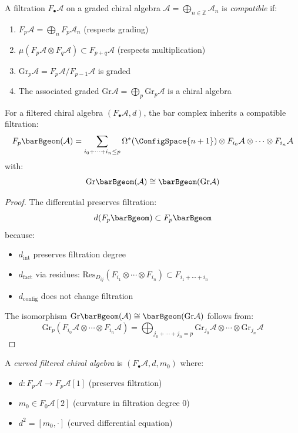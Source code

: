 \begin{definition}
A filtration $F_\bullet\mathcal{A}$ on a graded chiral algebra $\mathcal{A} = \bigoplus_{n \in \mathbb{Z}} \mathcal{A}_n$ is \emph{compatible} if:
\begin{enumerate}
\item $F_p\mathcal{A} = \bigoplus_{n} F_p\mathcal{A}_n$ (respects grading)
\item $\mu(F_p\mathcal{A} \otimes F_q\mathcal{A}) \subset F_{p+q}\mathcal{A}$ (respects multiplication)
\item $\text{Gr}_p\mathcal{A} = F_p\mathcal{A}/F_{p-1}\mathcal{A}$ is graded
\item The associated graded $\text{Gr}\mathcal{A} = \bigoplus_p \text{Gr}_p\mathcal{A}$ is a chiral algebra
\end{enumerate}
\end{definition}

\begin{theorem}
\label{thm:filtered-bar-complex}
For a filtered chiral algebra $(F_\bullet\mathcal{A}, d)$, the bar complex inherits a compatible filtration:
\[F_p\barBgeom(\mathcal{A}) = \sum_{i_0 + \cdots + i_n \leq p} \Omega^*(\ConfigSpace{n+1}) \otimes F_{i_0}\mathcal{A} \otimes \cdots \otimes F_{i_n}\mathcal{A}\]
with:
\[\text{Gr}\barBgeom(\mathcal{A}) \cong \barBgeom(\text{Gr}\mathcal{A})\]
\end{theorem}

\begin{proof}
The differential preserves filtration:
\[d(F_p\barBgeom) \subset F_p\barBgeom\]
because:
\begin{itemize}
\item $d_{\text{int}}$ preserves filtration degree
\item $d_{\text{fact}}$ via residues: $\text{Res}_{D_{ij}}(F_{i_1} \otimes \cdots \otimes F_{i_n}) \subset F_{i_1 + \cdots + i_n}$
\item $d_{\text{config}}$ does not change filtration
\end{itemize}

The isomorphism $\text{Gr}\barBgeom(\mathcal{A}) \cong \barBgeom(\text{Gr}\mathcal{A})$ follows from:
\[\text{Gr}_p(F_{i_0}\mathcal{A} \otimes \cdots \otimes F_{i_n}\mathcal{A}) = \bigoplus_{j_0 + \cdots + j_n = p} \text{Gr}_{j_0}\mathcal{A} \otimes \cdots \otimes \text{Gr}_{j_n}\mathcal{A}\]
\end{proof}

\begin{definition}
A \emph{curved filtered chiral algebra} is $(F_\bullet\mathcal{A}, d, m_0)$ where:
\begin{itemize}
\item $d: F_p\mathcal{A} \to F_p\mathcal{A}[1]$ (preserves filtration)
\item $m_0 \in F_0\mathcal{A}[2]$ (curvature in filtration degree 0)
\item $d^2 = [m_0, \cdot]$ (curved differential equation)
\end{itemize}
\end{definition}

